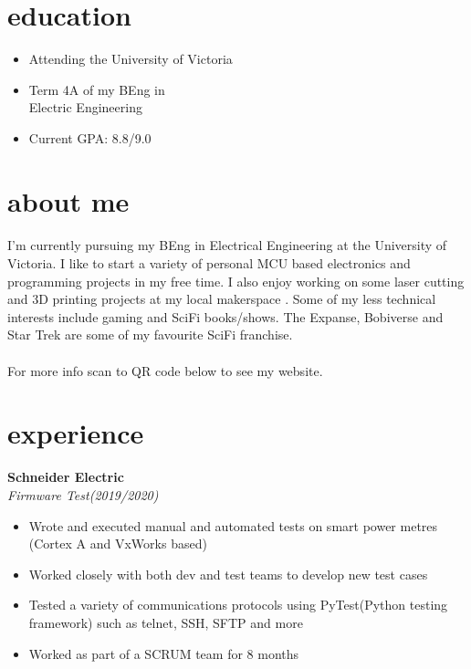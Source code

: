 \documentclass{article}
\newcommand{\minicolumns}[2]{
  \begin{minipage}[t]{0.25\textwidth}
    \begin{flushright}
      #1
    \end{flushright}
  \end{minipage}
  \hfill
  \begin{minipage}[t]{0.7\textwidth}
    #2
  \end{minipage}
}
\newcommand{\resumeSection}[3]{
  \minicolumns{
      \textbf{#1}\\
      \textit{#2}
    }
    {
      \begin{itemize}[leftmargin=*]
          \justifying
          \setlength\itemsep{-0.1em}
          #3
      \end{itemize}
  }
  \vspace{0.5\baselineskip}
}
\begin{document}
\begin{minipage}[t]{0.34\textwidth}
  \section{education}
  \begin{itemize}[leftmargin=*]
    \setlength\itemsep{-0.1em}
    \item Attending the University of Victoria
    \item Term 4A of my BEng in\\ Electric Engineering
    \item Current GPA: 8.8/9.0
  \end{itemize}

  \section{about me}
  \paragraph{}
  \raggedright
  I'm currently pursuing my BEng in Electrical Engineering at the University of Victoria. I like to start a variety of personal MCU based electronics and programming projects in my free time.  I also enjoy working on some laser cutting and 3D printing projects at my local makerspace . Some of my less technical interests include gaming and SciFi books/shows. The Expanse, Bobiverse and Star Trek are some of my favourite SciFi franchise.
  \paragraph{}
  For more info scan to QR code below to see my website.

  \vspace*{3em}
  \centering



\end{minipage}

\section{experience}
\resumeSection{Schneider Electric}{Firmware Test(2019/2020)}{
  \item Wrote and executed manual and automated tests on smart power metres (Cortex A and VxWorks based)
  \item Worked closely with both dev and test teams to develop new test cases
  \item Tested a variety of communications protocols using PyTest(Python testing framework) such as telnet, SSH, SFTP and more
  \item Worked as part of a SCRUM team for 8 months
}
\end{document}
